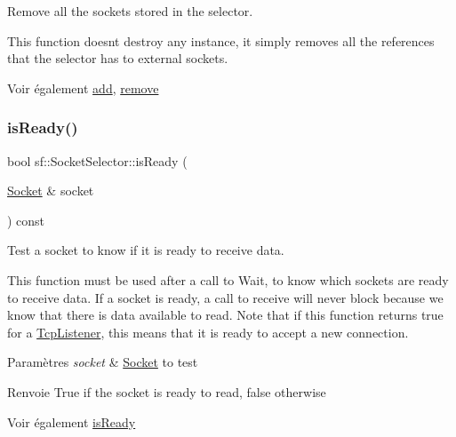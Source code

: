 Remove all the sockets stored in the selector. 

This function doesn\textquotesingle{}t destroy any instance, it simply removes all the references that the selector has to external sockets.

\begin{DoxySeeAlso}{Voir également}
\hyperlink{classsf_1_1SocketSelector_ade952013232802ff7b9b33668f8d2096}{add}, \hyperlink{classsf_1_1SocketSelector_a98b6ab693a65b82caa375639232357c1}{remove} 
\end{DoxySeeAlso}
\mbox{\label{classsf_1_1SocketSelector_a917a4bac708290a6782e6686fd3bf889}} 
\subsubsection{\texorpdfstring{is\+Ready()}{isReady()}}
{\footnotesize\ttfamily bool sf\+::\+Socket\+Selector\+::is\+Ready (\begin{DoxyParamCaption}\item[{\hyperlink{classsf_1_1Socket}{Socket} \&}]{socket }\end{DoxyParamCaption}) const}



Test a socket to know if it is ready to receive data. 

This function must be used after a call to Wait, to know which sockets are ready to receive data. If a socket is ready, a call to receive will never block because we know that there is data available to read. Note that if this function returns true for a \hyperlink{classsf_1_1TcpListener}{Tcp\+Listener}, this means that it is ready to accept a new connection.


\begin{DoxyParams}{Paramètres}
{\em socket} & \hyperlink{classsf_1_1Socket}{Socket} to test\\
\hline
\end{DoxyParams}
\begin{DoxyReturn}{Renvoie}
True if the socket is ready to read, false otherwise
\end{DoxyReturn}
\begin{DoxySeeAlso}{Voir également}
\hyperlink{classsf_1_1SocketSelector_a917a4bac708290a6782e6686fd3bf889}{is\+Ready} 
\end{DoxySeeAlso}
\mbox{\label{classsf_1_1SocketSelector_ae6395c7a8d29a9ea14939cc5d1ba3a33}} 
